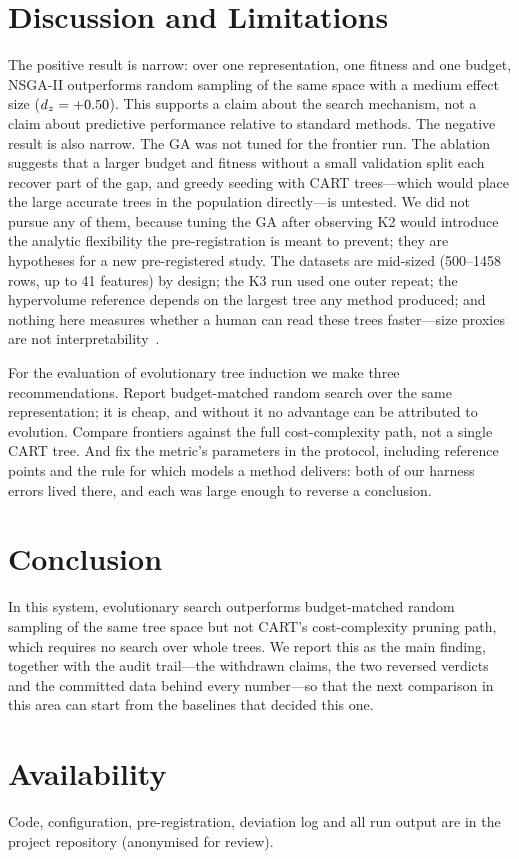 \documentclass[sigconf,review,anonymous]{acmart}
\newcommand{\GA}{GA\xspace}
\begin{document}
\section{Discussion and Limitations}

The positive result is narrow: over one representation, one fitness and one budget,
NSGA-II outperforms random sampling of the same space with a medium effect size
($d_z=+0.50$). This supports a claim about the search mechanism, not a claim about
predictive performance relative to standard methods. The negative result is also narrow. The \GA was not tuned for the frontier run. The
ablation suggests that a larger budget and fitness without a small validation split
each recover part of the gap, and greedy seeding with CART trees---which would place the large accurate
trees in the population directly---is untested. We did not pursue any of them, because
tuning the \GA after observing K2 would introduce the analytic flexibility the
pre-registration is meant to prevent; they are hypotheses for a new pre-registered study. The datasets are mid-sized
(500--1458 rows, up to 41 features) by design; the K3 run used one outer repeat; the
hypervolume reference depends on the largest tree any method produced; and nothing here
measures whether a human can read these trees faster---size proxies are not
interpretability~\cite{lipton2018,doshivelez2017}.

For the evaluation of evolutionary tree induction we make three recommendations. Report
budget-matched random search over the same representation; it is cheap, and without it
no advantage can be attributed to evolution. Compare frontiers against the full
cost-complexity path, not a single CART tree. And fix the metric's parameters in the protocol,
including reference points and the rule for which models a method delivers: both of our
harness errors lived there, and each was large enough to reverse a conclusion.

\section{Conclusion}

In this system, evolutionary search outperforms budget-matched random sampling of the
same tree space but not CART's cost-complexity pruning path, which requires no search over
whole trees. We report this as the main finding, together with the audit trail---the withdrawn claims, the two reversed verdicts and the committed data behind
every number---so that the next comparison in this area can start from the baselines
that decided this one.

\section*{Availability}
Code, configuration, pre-registration, deviation log and all run output are in the
project repository (anonymised for review).



\end{document}
